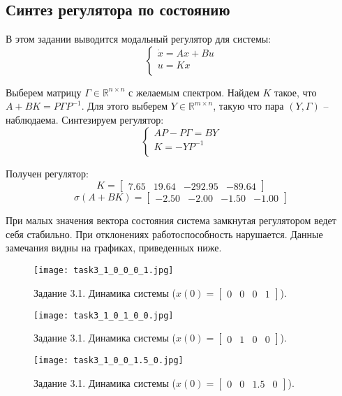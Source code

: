 \subsection{Синтез регулятора по состоянию}
В этом задании выводится модальный регулятор для системы:
\begin{equation}
    \begin{cases}
        \dot{x} = A x + Bu \\
        u = K x \\
\end{cases} 
\end{equation}

Выберем матрицу $\Gamma \in \mathbb{R}^{n \times n}$ с желаемым спектром. Найдем $K$ такое, что $A+BK = P \Gamma P^{-1}$.
Для этого выберем $Y \in \mathbb{R}^{m \times n}$, такую что пара $(Y, \Gamma)$ -- наблюдаема. Синтезируем регулятор:
\begin{equation}
        \begin{cases}
                AP - P\Gamma = BY \\
                K = -YP^{-1} \\
        \end{cases}
\end{equation}



Получен регулятор:
\[K = \begin{bmatrix}
    7.65 &  19.64 & -292.95 & -89.64
  \end{bmatrix}\]
\[\sigma(A + B K) = \begin{bmatrix}
    -2.50 & -2.00 & -1.50 & -1.00
\end{bmatrix}\]

При малых значения вектора состояния система замкнутая регулятором ведет себя стабильно. При отклонениях работоспособность нарушается. Данные замечания видны на графиках, приведенных ниже.

\begin{figure}[]
  \centering
  \texttt{[image: task3\_1\_0\_0\_0\_1.jpg]}
  \caption{Задание 3.1. Динамика системы ($x(0) = \begin{bmatrix} 0 & 0 & 0 & 1 \end{bmatrix}$).}
  \label{fig:task3_1_0_0_0_1.jpg} 
\end{figure}
\begin{figure}[]
    \centering
    \texttt{[image: task3\_1\_0\_1\_0\_0.jpg]}
    \caption{Задание 3.1. Динамика системы ($x(0) = \begin{bmatrix} 0 & 1 & 0 & 0 \end{bmatrix}$).}
    \label{fig:task3_1_0_0_0_1.5.jpg}
  \end{figure}
  \begin{figure}[]
    \centering
    \texttt{[image: task3\_1\_0\_0\_1.5\_0.jpg]}
    \caption{Задание 3.1. Динамика системы ($x(0) = \begin{bmatrix} 0 & 0 & 1.5 & 0 \end{bmatrix}$).}
    \label{fig:task3_1_0_0_0_1.5.jpg}
  \end{figure}

